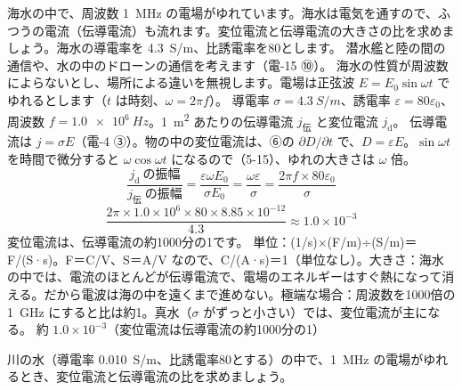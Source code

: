 \begin{phreidai}
\label{ph:電-14:ex3}海水の中で、周波数 \qty{1}{MHz} の電場がゆれています。海水は電気を通すので、ふつうの電流（伝導電流）も流れます。変位電流と伝導電流の大きさの比を求めましょう。海水の導電率を \qty{4.3}{S/m}、比誘電率を80とします。
\phbamen
潜水艦と陸の間の通信や、水の中のドローンの通信を考えます（電-15 ⑩）。
\phmushi
海水の性質が周波数によらないとし、場所による違いを無視します。電場は正弦波 $E=E_0\sin\omega t$ でゆれるとします（$t$ は時刻、$\omega=2\pi f$）。
\phzu
導電率 $\sigma=\qty{4.3}{S/m}$、誘電率 $\varepsilon=80\varepsilon_0$、周波数 $f=\qty{1.0e6}{Hz}$。\qty{1}{m^2} あたりの伝導電流 $j_{\text{伝}}$ と変位電流 $j_{\mathrm d}$。
\phriyu
伝導電流は $j=\sigma E$（電-4 ③）。物の中の変位電流は、⑥の $\partial D/\partial t$ で、$D=\varepsilon E$。$\sin\omega t$ を時間で微分すると $\omega\cos\omega t$ になるので（5-15）、ゆれの大きさは $\omega$ 倍。
\phtateru
\[ \frac{j_{\mathrm d}\ \text{の振幅}}{j_{\text{伝}}\ \text{の振幅}}=\frac{\varepsilon\omega E_0}{\sigma E_0}=\frac{\omega\varepsilon}{\sigma}=\frac{2\pi f\times80\varepsilon_0}{\sigma} \]
\phtoku
\[ \frac{2\pi\times1.0\times10^6\times80\times8.85\times10^{-12}}{4.3}\approx1.0\times10^{-3} \]
変位電流は、伝導電流の約1000分の1です。
\phtashikame
単位：(1/s)×(F/m)÷(S/m)＝F/(S·s)。F＝C/V、S＝A/V なので、C/(A·s)＝1（単位なし）。大きさ：海水の中では、電流のほとんどが伝導電流で、電場のエネルギーはすぐ熱になって消える。だから電波は海の中を遠くまで進めない。極端な場合：周波数を1000倍の \qty{1}{GHz} にすると比は約1。真水（$\sigma$ がずっと小さい）では、変位電流が主になる。
\kotae 約 $1.0\times10^{-3}$（変位電流は伝導電流の約1000分の1）
\end{phreidai}
\begin{jibun}
川の水（導電率 \qty{0.010}{S/m}、比誘電率80とする）の中で、\qty{1}{MHz} の電場がゆれるとき、変位電流と伝導電流の比を求めましょう。
\end{jibun}

